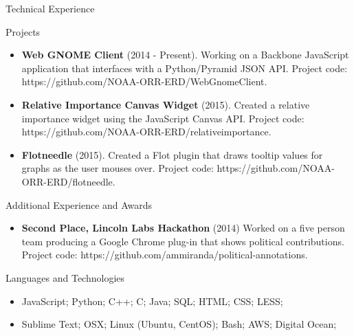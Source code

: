 \documentclass[]{mcdowellcv}
\begin{document}
	\begin{cvsection}{Technical Experience}
		\begin{cvsubsection}{Projects}{}{}
			\begin{itemize}
                \item \textbf{Web GNOME Client} (2014 - Present). Working on a Backbone JavaScript application that interfaces with a Python/Pyramid JSON API. Project code: https://github.com/NOAA-ORR-ERD/WebGnomeClient. 
				\item \textbf{Relative Importance Canvas Widget} (2015). Created a relative importance widget using the JavaScript Canvas API. Project code: https://github.com/NOAA-ORR-ERD/relativeimportance.
                \item \textbf{Flotneedle} (2015). Created a Flot plugin that draws tooltip values for graphs as the user mouses over. Project code: https://github.com/NOAA-ORR-ERD/flotneedle.
			\end{itemize}
		\end{cvsubsection}
	\end{cvsection}
	
	\begin{cvsection}{Additional Experience and Awards}
		\begin{cvsubsection}{}{}{}	
			\begin{itemize}
				\item \textbf{Second Place, Lincoln Labs Hackathon} (2014) Worked on a five person team producing a Google Chrome plug-in that shows political contributions. Project code: https://github.com/ammiranda/political-annotations.
			\end{itemize}
		\end{cvsubsection}
	\end{cvsection}
	
	\begin{cvsection}{Languages and Technologies}
		\begin{cvsubsection}{}{}{}	
			\begin{itemize}
				\item JavaScript; Python; C++; C; Java; SQL; HTML; CSS; LESS; 
                \item Sublime Text; OSX; Linux (Ubuntu, CentOS); Bash; AWS; Digital Ocean;
			\end{itemize}
		\end{cvsubsection}
	\end{cvsection}
	
\end{document}

